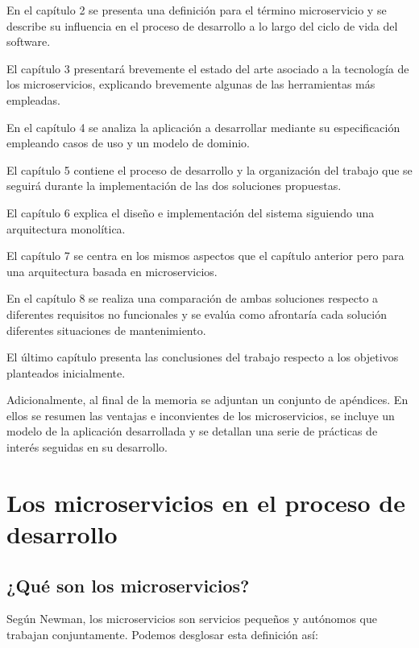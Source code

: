 \documentclass[11pt,spanish,listoffigures]{tfgetsinf}
\begin{document}
En el capítulo 2 se presenta una definición para el término microservicio y se describe su influencia en el proceso de desarrollo a lo largo del ciclo de vida del software.

El capítulo 3 presentará brevemente el estado del arte asociado a la tecnología de los microservicios, explicando brevemente algunas de las herramientas más empleadas.

En el capítulo 4 se analiza la aplicación a desarrollar mediante su especificación   empleando casos de uso y un modelo de dominio.

El capítulo 5 contiene el proceso de desarrollo y la organización del trabajo que se seguirá durante la implementación de las dos soluciones propuestas.

El capítulo 6 explica el diseño e implementación del sistema siguiendo una arquitectura monolítica.

El capítulo 7 se centra en los mismos aspectos que el capítulo anterior pero para una arquitectura basada en microservicios.

En el capítulo 8 se realiza una comparación de ambas soluciones respecto a diferentes requisitos no funcionales  y se evalúa como afrontaría cada solución diferentes situaciones de mantenimiento.

El último capítulo presenta las conclusiones del trabajo respecto a los objetivos planteados inicialmente.

Adicionalmente, al final de la memoria se adjuntan un conjunto de apéndices. En ellos se resumen las ventajas e inconvientes de los microservicios, se incluye un modelo de la aplicación desarrollada y se detallan una serie de prácticas de interés seguidas en su desarrollo.

%

\chapter{Los microservicios en el proceso de desarrollo}

\section{¿Qué son los microservicios?}

Según Newman, los microservicios son servicios pequeños y autónomos que trabajan conjuntamente. \cite{Newman2015a} Podemos desglosar esta definición así:
\end{document}
